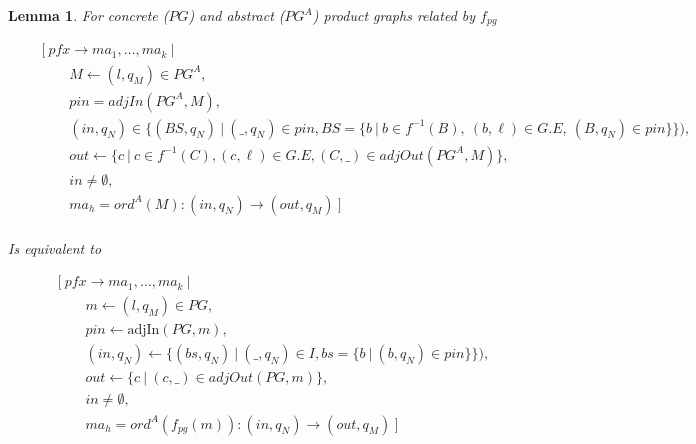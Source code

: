 \documentclass[twocolumn, openany]{sig-alternate-10pt}
\newtheorem{lem}[thm]{Lemma}
\begin{document}
\begin{lem}

  For concrete ($PG$) and abstract ($PG^A$) product graphs related by $f_{pg}$

  \[ \begin{array}{l}
     ~~~~~~~~~ [~ pfx \rightarrow ma_1, \dots, ma_k ~\vert~ \\
     ~~~~~~~~~~~~~~~~~~ M \leftarrow (l,q_M) \in PG^A, \\
     ~~~~~~~~~~~~~~~~~~ pin = \mathit{adjIn}(PG^A,M), \\
     ~~~~~~~~~~~~~~~~~~ (in,q_N) \in \{(BS,q_N) ~\vert~ (\_,q_N) \in pin, BS=\{b ~\vert~ b \in f^{-1}(B),~ (b,\ell) \in G.E,~ (B,q_N) \in pin \} \}), \\
     ~~~~~~~~~~~~~~~~~~ out \leftarrow \{ c ~\vert~ c \in f^{-1}(C), (c,\ell) \in G.E, (C,\_) \in \mathit{adjOut}(PG^A,M) \}, \\
     ~~~~~~~~~~~~~~~~~~ in \neq \emptyset, \\
     ~~~~~~~~~~~~~~~~~~ ma_h = ord^A(M) : (in,q_N) \rightarrow (out,q_M) ~] \\
  \end{array} \]%

  Is equivalent to

  \[ \begin{array}{l}
     ~~~~~~~~~ [~ pfx \rightarrow ma_1, \dots, ma_k ~\vert~ \\
     ~~~~~~~~~~~~~~~~~~ m \leftarrow (l,q_M) \in PG, \\
     ~~~~~~~~~~~~~~~~~~ pin \leftarrow \text{adjIn}(PG,m), \\
     ~~~~~~~~~~~~~~~~~~ (in,q_N) \leftarrow \{ (bs,q_N) ~\vert~ (\_,q_N) \in I, bs=\{ b ~\vert~ (b,q_N) \in pin\} \}), \\
     ~~~~~~~~~~~~~~~~~~ out \leftarrow \{ c ~\vert~ (c,\_) \in \mathit{adjOut}(PG,m) \}, \\
     ~~~~~~~~~~~~~~~~~~ in \neq \emptyset, \\
     ~~~~~~~~~~~~~~~~~~ ma_h = ord^A(f_{pg}(m)) : (in,q_N) \rightarrow (out,q_M) ~] \\
  \end{array} \]%


\end{lem}
\end{document}
